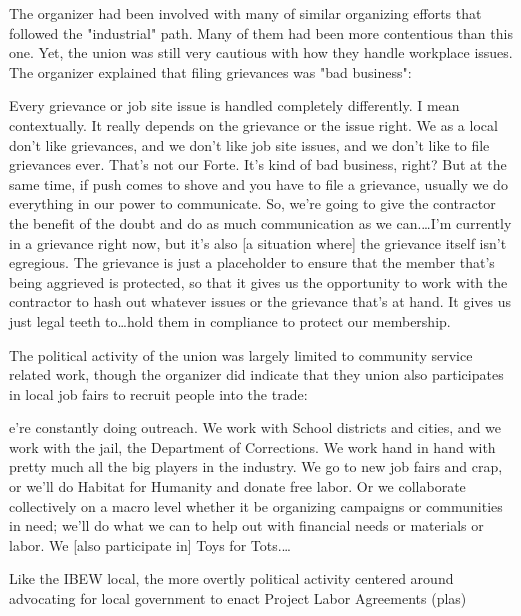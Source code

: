 \documentclass[12pt]{article}
\renewenvironment{quote}
  {\list{}{\leftmargin=\parindent\rightmargin=0pt}%
   \item\relax}
  {\endlist}
\begin{document}
The organizer had been involved with many of similar organizing efforts that followed the "industrial" path. Many of them had been more contentious than this one. Yet, the union was still very cautious with how they handle workplace issues. The organizer explained that filing grievances was "bad business":

\begin{quote}
Every grievance or job site issue is handled completely differently. I mean contextually. It really depends on the grievance or the issue right. We as a local don't like grievances, and we don't like job site issues, and we don't like to file grievances ever. That's not our Forte. It's kind of bad business, right? But at the same time, if push comes to shove and you have to file a grievance, usually we do everything in our power to communicate. So, we're going to give the contractor the benefit of the doubt and do as much communication as we can.\ldots I'm currently in a grievance right now, but it's also [a situation where] the grievance itself isn't egregious. The grievance is just a placeholder to ensure that the member that's being aggrieved is protected, so that it gives us the opportunity to work with the contractor to hash out whatever issues or the grievance that's at hand. It gives us just legal teeth to\ldots hold them in compliance to protect our membership.
\end{quote}

The political activity of the union was largely limited to community service related work, though the organizer did indicate that they union also participates in local job fairs to recruit people into the trade:

\begin{quote}
[W]e're constantly doing outreach. We work with School districts and cities, and we work with the jail, the Department of Corrections. We work hand in hand with pretty much all the big players in the industry. We go to new job fairs and crap, or we'll do Habitat for Humanity and donate free labor. Or we collaborate collectively on a macro level whether it be organizing campaigns or communities in need; we'll do what we can to help out with financial needs or materials or labor. We [also participate in] Toys for Tots.\ldots
\end{quote}

Like the IBEW local, the more overtly political activity centered around advocating for local government to enact Project Labor Agreements (\acrshort{pla}s)
\end{document}
